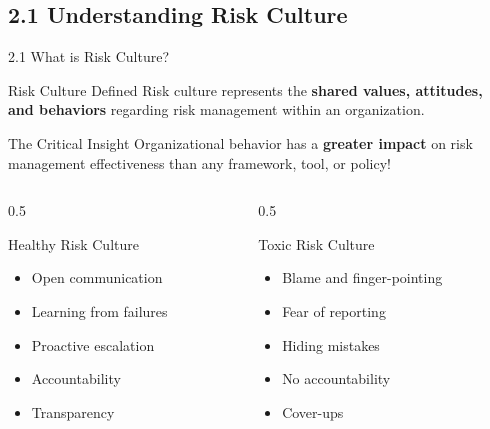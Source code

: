 \documentclass[10pt]{beamer}  %
\begin{document}
	\subsection{2.1 Understanding Risk Culture}
	\begin{frame}{2.1 What is Risk Culture?}
		\begin{block}{Risk Culture Defined}
			Risk culture represents the \textbf{shared values, attitudes, and behaviors} regarding risk management within an organization.
		\end{block}
		
		\begin{alertblock}{The Critical Insight}
			Organizational behavior has a \textbf{greater impact} on risk management effectiveness than any framework, tool, or policy!
		\end{alertblock}
		
		\begin{columns}
			\begin{column}{0.5\textwidth}
				\begin{block}{Healthy Risk Culture}
					\begin{itemize}
						\item Open communication
						\item Learning from failures
						\item Proactive escalation
						\item Accountability
						\item Transparency
					\end{itemize}
				\end{block}
			\end{column}
			\begin{column}{0.5\textwidth}
				\begin{block}{Toxic Risk Culture}
					\begin{itemize}
						\item Blame and finger-pointing
						\item Fear of reporting
						\item Hiding mistakes
						\item No accountability
						\item Cover-ups
					\end{itemize}
				\end{block}
			\end{column}
		\end{columns}
	\end{frame}
	
\end{document}
